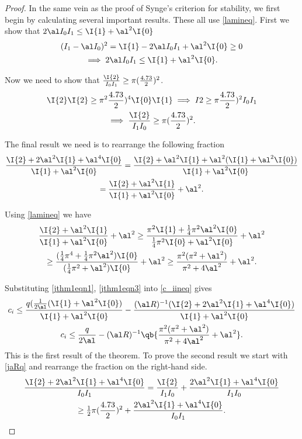 \begin{proof}
    In the same vein as the proof of Synge's criterion for stability, we first begin by calculating several important results. These all use \eqref{lamineq}. First we show that $ 2 \al I_0 I_1 \leq \I{1} + \al^2 \I{0} $
    \begin{gather}
        (I_1 - \al I_0)^2 = \I{1} - 2 \al I_0 I_1 + \al^2 \I{0} \geq 0 \nonumber\\
        \implies 2 \al I_0 I_1 \leq \I{1} + \al^2 \I{0}.
    \label{jthm1eqn1}
    \end{gather}

    Now we need to show that $ \frac{\I{2}}{I_0 I_1} \geq \pi (\frac{4.73}{2})^2 $.
    \begin{gather}
        \I{2} \I{2} \geq \pi^2 \frac{4.73}{2})^4 \I{0} \I{1} \implies I{2} \geq \pi \frac{4.73}{2})^2 I_0 I_1 \nonumber\\
        \implies \frac{\I{2}}{I_1 I_0} \geq \pi (\frac{4.73}{2})^2.
    \label{jthm1eqn2}
    \end{gather}

    The final result we need is to rearrange the following fraction
    \begin{gather}
        \frac{\I{2} + 2 \al^2 \I{1} + \al^4 \I{0}}{\I{1} + \al^2 \I{0}}
        = \frac{\I{2} + \al^2 \I{1} + \al^2 (\I{1} + \al^2 \I{0})}{\I{1} + \al^2 \I{0}} \nonumber\\
        = \frac{\I{2} + \al^2 \I{1}}{\I{1} + \al^2 \I{0}} + \al^2.
    \end{gather}

    Using \eqref{lamineq} we have
    \begin{gather}
        \frac{\I{2} + \al^2 \I{1}}{\I{1} + \al^2 \I{0}} + \al^2 \geq \frac{\pi^2 \I{1} + \tfrac{1}{4} \pi^2 \al^2 \I{0}}{\tfrac{1}{4} \pi^2 \I{0} + \al^2 \I{0}} + \al^2 \nonumber\\
        \geq \frac{(\tfrac{1}{4} \pi^4 + \tfrac{1}{4} \pi^2 \al^2) \I{0}}{(\tfrac{1}{4} \pi^2 + \al^2) \I{0}} + \al^2 \geq \frac{\pi^2 (\pi^2 + \al^2)}{\pi^2 + 4 \al^2} + \al^2.
        \label{jthm1eqn3}
    \end{gather}

    Substituting \eqref{jthm1eqn1}, \eqref{jthm1eqn3} into \eqref{c_iineq} gives
    \begin{gather}
        c_i \leq \frac{q ( \tfrac{1}{2 \al} (\I{1} + \al^2 \I{0})}{\I{1} + \al^2 \I{0}} - \frac{(\al R)^{-1} (\I{2} + 2 \al^2 \I{1} + \al^4 \I{0})}{\I{1} + \al^2 \I{0}} \nonumber\\
        c_i \leq \frac{q}{2 \al } - (\al R)^{-1} \qb{\frac{\pi^2 (\pi^2 + \al^2)}{\pi^2 + 4 \al^2} + \al^2}.
    \end{gather}
    This is the first result of the theorem. To prove the second result we start with \eqref{jaRq} and rearrange the fraction on the right-hand side.
    \begin{gather}
        \frac{\I{2} + 2 \al^2 \I{1} + \al^4 \I{0}}{I_0 I_1} = \frac{\I{2}}{I_1 I_0} + \frac{2 \al^2 \I{1} + \al^4 \I{0}}{I_1 I_0} \nonumber\\
        \geq \tfrac{1}{2} \pi (\frac{4.73}{2})^2 + \frac{2 \al^2 \I{1} + \al^4 \I{0}}{I_0 I_1}.
    \end{gather}
    

\end{proof}
